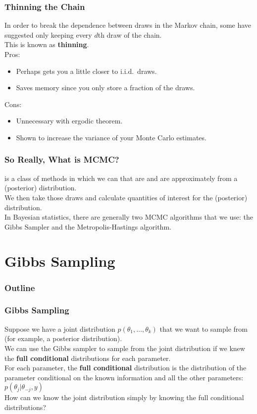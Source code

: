 \documentclass{beamer}
\begin{document}
\begin{frame}
\frametitle{Thinning the Chain}
\pause
In order to break the dependence between draws in the Markov chain,
some have suggested only keeping every $d$th draw of the chain. \\
\bigskip
\pause
This is known as \textbf{thinning}.\\
\bigskip
\pause
Pros: 
\begin{itemize}
\pause
\item Perhaps gets you a little closer to i.i.d.\ draws.
\pause
\item Saves memory since you only store a fraction of the draws.
\end{itemize}
\bigskip
\pause
Cons:
\begin{itemize}
\pause
\item Unnecessary with ergodic theorem.
\pause
\item Shown to increase the variance of your Monte Carlo estimates.
\end{itemize}
\end{frame}

\begin{frame}
\frametitle{So Really, What is MCMC?}
\pause
{} is a class of methods in which we can  that are  and are
approximately from a (posterior) distribution.  \\
\bigskip
\pause
We then take those draws and calculate quantities of interest for the
(posterior) distribution.\\
\bigskip
\pause
In Bayesian statistics, there are generally two MCMC algorithms that
we use: the Gibbs Sampler and the Metropolis-Hastings algorithm.
\end{frame}

\section{Gibbs Sampling}

\begin{frame}
\frametitle{Outline}
\tableofcontents[currentsection]
\end{frame}

\begin{frame}
\frametitle{Gibbs Sampling}
\pause
Suppose we have a joint distribution $p(\theta_1, \dots,\theta_k)$
that we want to sample from (for example, a posterior distribution). \\  
\bigskip
\pause
We can use the Gibbs sampler to sample from the joint distribution if
we knew the \textbf{full conditional} distributions for each parameter.\\
\bigskip
\pause
For each parameter, the \textbf{full conditional} distribution is the
distribution of the parameter conditional on the known information and
all the other parameters: \pause $p(\theta_j | \theta_{-j}, y)$\\
\bigskip
\pause
How can we know the joint distribution simply by knowing the full
conditional distributions?
\end{frame}
\end{document}
